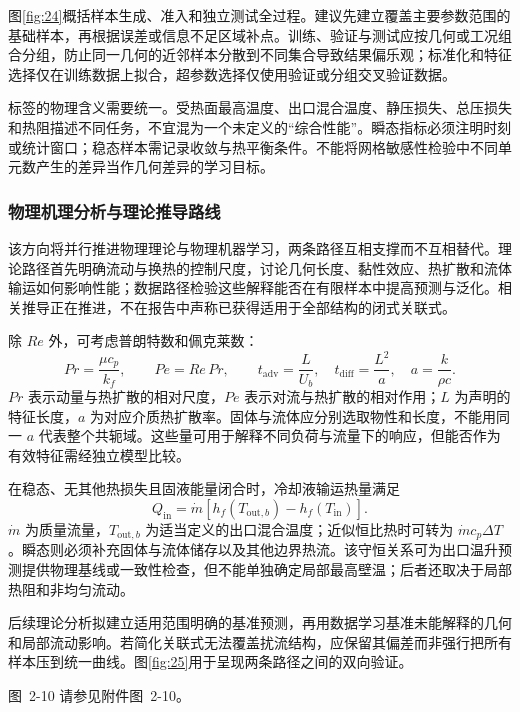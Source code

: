 \documentclass[UTF8]{midterm}
\makeatletter
\newcommand{\submissionnumber}[1]{\def\@currentlabel{#1}}
\makeatother
\begin{document}
图\ref{fig:24}概括样本生成、准入和独立测试全过程。建议先建立覆盖主要参数范围的基础样本，再根据误差或信息不足区域补点。训练、验证与测试应按几何或工况组合分组，防止同一几何的近邻样本分散到不同集合导致结果偏乐观；标准化和特征选择仅在训练数据上拟合，超参数选择仅使用验证或分组交叉验证数据。

标签的物理含义需要统一。受热面最高温度、出口混合温度、静压损失、总压损失和热阻描述不同任务，不宜混为一个未定义的“综合性能”。瞬态指标必须注明时刻或统计窗口；稳态样本需记录收敛与热平衡条件。不能将网格敏感性检验中不同单元数产生的差异当作几何差异的学习目标。

\subsubsection{物理机理分析与理论推导路线}
该方向将并行推进物理理论与物理机器学习，两条路径互相支撑而不互相替代。理论路径首先明确流动与换热的控制尺度，讨论几何长度、黏性效应、热扩散和流体输运如何影响性能；数据路径检验这些解释能否在有限样本中提高预测与泛化。相关推导正在推进，不在报告中声称已获得适用于全部结构的闭式关联式。

除 $Re$ 外，可考虑普朗特数和佩克莱数：
\begin{equation}
Pr=\frac{\mu c_p}{k_f},\qquad Pe=Re\,Pr,\qquad
t_{\mathrm{adv}}=\frac{L}{U_b},\quad t_{\mathrm{diff}}=\frac{L^2}{a},\quad a=\frac{k}{\rho c}.\label{eq:scales}
\end{equation}
$Pr$ 表示动量与热扩散的相对尺度，$Pe$ 表示对流与热扩散的相对作用；$L$ 为声明的特征长度，$a$ 为对应介质热扩散率。固体与流体应分别选取物性和长度，不能用同一 $a$ 代表整个共轭域。这些量可用于解释不同负荷与流量下的响应，但能否作为有效特征需经独立模型比较。

在稳态、无其他热损失且固液能量闭合时，冷却液输运热量满足
\begin{equation}
Q_{\mathrm{in}}=\dot m\left[h_f(T_{\mathrm{out},b})-h_f(T_{\mathrm{in}})\right].\label{eq:bulkenergy}
\end{equation}
$\dot m$ 为质量流量，$T_{\mathrm{out},b}$ 为适当定义的出口混合温度；近似恒比热时可转为 $\dot m c_p\Delta T$。瞬态则必须补充固体与流体储存以及其他边界热流。该守恒关系可为出口温升预测提供物理基线或一致性检查，但不能单独确定局部最高壁温；后者还取决于局部热阻和非均匀流动。

后续理论分析拟建立适用范围明确的基准预测，再用数据学习基准未能解释的几何和局部流动影响。若简化关联式无法覆盖扰流结构，应保留其偏差而非强行把所有样本压到统一曲线。图\ref{fig:25}用于呈现两条路径之间的双向验证。

\par\noindent \begingroup\submissionnumber{2-10}\label{fig:25}\endgroup 图~2-10 请参见附件图~2-10。\par
\end{document}
